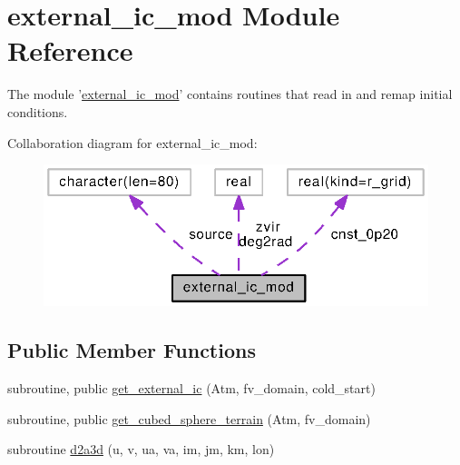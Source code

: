 \section{external\-\_\-ic\-\_\-mod Module Reference}
\label{classexternal__ic__mod}


The module '\hyperlink{classexternal__ic__mod}{external\-\_\-ic\-\_\-mod}' contains routines that read in and remap initial conditions.  




Collaboration diagram for external\-\_\-ic\-\_\-mod\-:
\nopagebreak
\begin{figure}[H]
\begin{center}
\leavevmode
\includegraphics[width=320pt]{classexternal__ic__mod__coll__graph}
\end{center}
\end{figure}
\subsection*{Public Member Functions}
\begin{DoxyCompactItemize}
\item 
subroutine, public \hyperlink{classexternal__ic__mod_a8f9e9f938dc0cd8b8fa9507c1d581991}{get\-\_\-external\-\_\-ic} (Atm, fv\-\_\-domain, cold\-\_\-start)
\item 
subroutine, public \hyperlink{classexternal__ic__mod_a3db18261474605831898bc15fee4fec9}{get\-\_\-cubed\-\_\-sphere\-\_\-terrain} (Atm, fv\-\_\-domain)
\item 
subroutine \hyperlink{classexternal__ic__mod_a32ccd1a4f2bb9212e850d591bc0a2e0c}{d2a3d} (u, v, ua, va, im, jm, km, lon)
\end{DoxyCompactItemize}
